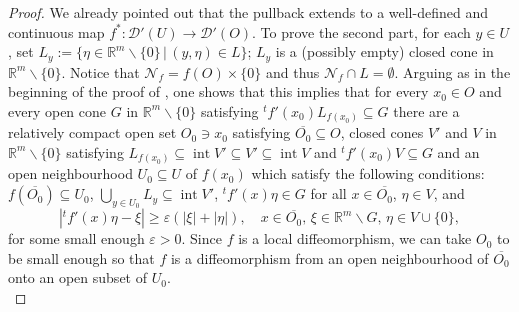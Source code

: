 \documentclass[12pt,reqno]{amsart}
\newcommand{\RR}{\mathbb R}
\newcommand{\DD}{\mathcal D}
\theoremstyle{plain}
\theoremstyle{remark}
\theoremstyle{definition}
\numberwithin{equation}{section}
\begin{document}
\begin{proof}
We already pointed out that the pullback extends to a well-defined and continuous map $f^*:\DD'(U)\rightarrow \DD'(O)$. To prove the second part, for each $y\in U$, set $L_y:=\{\eta\in\RR^m\backslash\{0\}\,|\, (y,\eta)\in L\}$; $L_y$ is a (possibly empty) closed cone in $\RR^m\backslash\{0\}$. Notice that $\mathcal{N}_f=f(O)\times \{0\}$ and thus $\mathcal{N}_f\cap L=\emptyset$. Arguing as in the beginning of the proof of \cite[Theorem 3.21]{PP}, one shows that this implies that for every $x_0\in O$ and every open cone $G$ in $\RR^m\backslash\{0\}$ satisfying ${}^tf'(x_0)L_{f(x_0)}\subseteq G$ there are a relatively compact open set $O_0\ni x_0$ satisfying $\overline{O_0}\subseteq O$, closed cones $V'$ and $V$ in $\RR^m\backslash\{0\}$ satisfying $L_{f(x_0)}\subseteq \operatorname{int} V'\subseteq V' \subseteq \operatorname{int}V$ and ${}^tf'(x_0)V\subseteq G$ and an open neighbourhood $U_0\subseteq U$ of $f(x_0)$ which satisfy the following conditions: $f(\overline{O_0})\subseteq U_0$, $\bigcup_{y\in U_0} L_y \subseteq \operatorname{int}V'$, ${}^tf'(x)\eta\in G$ for all $x\in \overline{O_0}$, $\eta\in V$, and
\begin{equation}\label{ine-for-stati-phase-methd}
|{}^t f'(x)\eta-\xi|\geq \varepsilon(|\xi|+|\eta|),\quad x\in\overline{O_0},\, \xi\in \RR^m\backslash G,\, \eta\in V\cup\{0\},
\end{equation}
for some small enough $\varepsilon>0$. Since $f$ is a local diffeomorphism, we can take $O_0$ to be small enough so that $f$ is a diffeomorphism from an open neighbourhood of $\overline{O_0}$ onto an open subset of $U_0$.\\

\end{proof}
\end{document}
